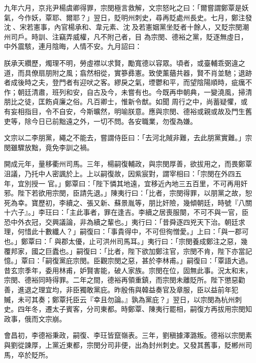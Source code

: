\begin{pinyinscope}
 九年六月，京兆尹楊虞卿得罪，宗閔極言救解，文宗怒叱之曰：「爾嘗謂鄭覃是妖氣，今作妖，覃耶、爾耶？」翌日，貶明州刺史，尋再貶處州長史。七月，鄭注發沈、宋若憲事，內官楊承和、韋元素、沈及若憲姻黨坐貶者十餘人，又貶宗閔潮州司戶。時訓、注竊弄威權，凡不附己者，目
 為宗閔、德裕之黨，貶逐無虛日，中外震駭，連月陰晦，人情不安。九月詔曰：



 朕承天纘歷，燭理不明，勞虛襟以求賢，勵寬德以容眾。頃者，或臺輔乖弼違之道，而具僚扇朋附之風；翕然相從，實篸彞憲。致使薰蕕共器，賢不肖並馳；退跡者成後時之夫，登門者有迎吠之客。繆戾之氣，堙鬱和平，而望陰陽順時，疵癘不作；朝廷清肅，班列和安，自古及今，未嘗有也。今既再申朝典，一變澆風，掃清朋比之徒，匡飭貞廉之俗。凡百卿士，惟新令猷。如聞
 周行之中，尚蓄疑懼，或有妄相指目，令不自安，今斯曠然，明喻朕意。應與宗閔、德裕或親或故及門生舊吏等，除今日已前黜遠之外，一切不問。各安職業，勿復為嫌。



 文宗以二李朋黨，繩之不能去，嘗謂侍臣曰：「去河北賊非難，去此朋黨實難。」宗閔雖驟放黜，竟免李訓之禍。



 開成元年，量移衢州司馬。三年，楊嗣復輔政，與宗閔厚善，欲拔用之，而畏鄭覃沮議，乃托中人密諷於上。上以嗣復故，因紫宸對，謂宰相曰：「宗閔在外四五年，宜別授一
 官。」鄭覃曰：「陛下憐其地遠，宜移近內地三五百里，不可再用奸邪。陛下若欲用宗閔，臣請先退。」陳夷行曰：「比者，宗閔得罪，以朋黨之故，恕死為幸。寶歷初，李續之、張又新、蘇景胤等，朋比奸險，幾傾朝廷，時號『八關十六子』。」李玨曰：「主此事者，罪在逢吉。李續之居喪服闋，不可不與一官，臣恐中外衣冠，交興議論，非為續之輩也。」夷行曰：「昔舜逐四兇天下治。朝廷求理，何惜此十數纖人？」嗣復曰：「事貴得中，不可但徇憎愛。」上曰：「與一郡可也。」鄭覃曰：「
 與郡太優，止可洪州司馬耳。」夷行曰：「宗閔養成鄭注之惡，幾覆邦家，國之巨蠹也。」嗣復曰：「比者，陛下欲加鄭注官，宗閔不肯，陛下亦當記憶。」覃曰：「嗣復黨庇宗閔。臣觀宗閔之惡，甚於李林甫。」嗣復曰：「覃語大過。昔玄宗季年，委用林甫，妒賢害能，破人家族。宗閔在位，固無此事。況太和末，宗閔、德裕同時得罪。二年之間，德裕再領重鎮，而宗閔未離貶所。陛下懲惡勸善，進退之理宜均，非臣獨敢黨庇。昨殷侑與韓益奏官及章服，臣以益前年犯
 贓，未可其奏；鄭覃托臣云『幸且勿論。』孰為黨庇？」翌日，以宗閔為杭州刺史。四年冬，遷太子賓客，分司東都。時鄭覃、陳夷行罷相，嗣復方再拔用宗閔知政事，俄而文宗崩。



 會昌初，李德裕秉政，嗣復、李玨皆竄嶺表。三年，劉稹據澤潞叛。德裕以宗閔素與劉從諫厚，上黨近東都，宗閔分司非便，出為封州刺史。又發其舊事，貶郴州司馬，卒於貶所。




\end{pinyinscope}
